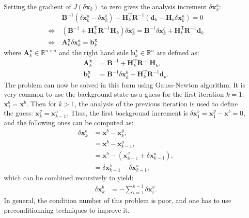 \documentclass[npg, manuscript]{copernicus}
\begin{document}
Setting the gradient of $J(\delta \mathbf{x}_k)$ to zero gives the analysis increment $\delta \mathbf{x}^a_k$:
\begin{align}
\label{eq:inc}
& \ \mathbf{B}^{-1} \left(\delta \mathbf{x}^a_k - \delta \mathbf{x}^b_k\right) - \mathbf{H}_k^\mathrm{T} \mathbf{R}^{-1} \left(\mathbf{d}_k - \mathbf{H}_k \delta \mathbf{x}^a_k\right) = 0 \nonumber \\
\Leftrightarrow & \ \left(\mathbf{B}^{-1} + \mathbf{H}_k^\mathrm{T} \mathbf{R}^{-1} \mathbf{H}_k\right) \delta \mathbf{x}^a_k = \mathbf{B}^{-1} \delta \mathbf{x}^b_k + \mathbf{H}_k^\mathrm{T} \mathbf{R}^{-1} \mathbf{d}_k \nonumber \\
\Leftrightarrow & \ \boxed{\mathbf{A}^\mathbf{x}_k \delta \mathbf{x}^a_k = \mathbf{b}^\mathbf{x}_k}
\end{align}
where $\mathbf{A}^\mathbf{x}_k \in \mathbb{R}^{n \times n}$ and the right hand side $\mathbf{b}^\mathbf{x}_k \in \mathbb{R}^{n}$ are defined as:
\begin{align}
\mathbf{A}^\mathbf{x}_k & = \mathbf{B}^{-1} + \mathbf{H}_k^\mathrm{T} \mathbf{R}^{-1} \mathbf{H}_k , \\
\mathbf{b}^\mathbf{x}_k & = \mathbf{B}^{-1} \delta \mathbf{x}^b_k + \mathbf{H}_k^\mathrm{T} \mathbf{R}^{-1} \mathbf{d}_k .
\end{align}
The problem can now be solved in this form using Gauss-Newton algorithm. It is very common to use the background state as a guess for the first iteration $k=1$: $\mathbf{x}^g_1 = \mathbf{x}^b$. Then for $k>1$, the analysis of the previous iteration is used to define the guess: $\mathbf{x}^g_k = \mathbf{x}^a_{k-1}$. Thus, the first background increment is $\delta \mathbf{x}^b_1 = \mathbf{x}^g_1 - \mathbf{x}^b = 0$, and the following ones can be computed as:
\begin{align}
\delta \mathbf{x}^b_k & = \mathbf{x}^b - \mathbf{x}^g_k, \nonumber \\
& = \mathbf{x}^b - \mathbf{x}^a_{k-1}, \nonumber \\
& = \mathbf{x}^b - \left(\mathbf{x}^g_{k-1} + \delta \mathbf{x}^a_{k-1}\right), \nonumber \\
& = \delta \mathbf{x}^b_{k-1} - \delta \mathbf{x}^a_{k-1},
\end{align}
which can be combined recursively to yield:
\begin{align}
\label{eq:back_inc}
\delta \mathbf{x}^b_k & = - \sum_{i=1}^{k-1} \delta \mathbf{x}^a_i.
\end{align}
In general, the condition number of this problem is poor, and one has to use preconditionning techniques to improve it.
\end{document}
